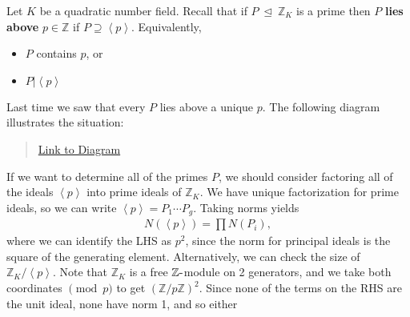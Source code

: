Let \(K\) be a quadratic number field. Recall that if
\(P {~\trianglelefteq~}{\mathbb{Z}}_K\) is a prime then \(P\)
\textbf{lies above} \(p\in {\mathbb{Z}}\) if
\(P \supseteq \left\langle{ p }\right\rangle\). Equivalently,

\begin{itemize}
\tightlist
\item
  \(P\) contains \(p\), or
\item
  \(P \mathrel{\Big|}\left\langle{ p }\right\rangle\)
\end{itemize}

Last time we saw that every \(P\) lies above a unique \(p\). The
following diagram illustrates the situation:

\begin{center}
\end{center}

\begin{quote}
\href{https://q.uiver.app/?q=WzAsNixbMCwwLCJLIl0sWzAsMiwiXFxRUSJdLFsyLDAsIlxcWlpfSyJdLFsyLDIsIlxcWloiXSxbNCwwLCJQIl0sWzQsMiwicCJdLFswLDEsIiIsMCx7InN0eWxlIjp7ImhlYWQiOnsibmFtZSI6Im5vbmUifX19XSxbMiwzLCIiLDAseyJzdHlsZSI6eyJoZWFkIjp7Im5hbWUiOiJub25lIn19fV0sWzQsNSwiIiwwLHsic3R5bGUiOnsiaGVhZCI6eyJuYW1lIjoibm9uZSJ9fX1dXQ==}{Link
to Diagram}
\end{quote}

If we want to determine all of the primes \(P\), we should consider
factoring all of the ideals \(\left\langle{ p }\right\rangle\) into
prime ideals of \({\mathbb{Z}}_K\). We have unique factorization for
prime ideals, so we can write
\(\left\langle{ p }\right\rangle = P_1 \cdots P_g\). Taking norms yields
\begin{align*}
N( \left\langle{ p }\right\rangle ) = \prod N(P_i) 
,\end{align*}
where we can identify the LHS as \(p^2\), since the norm for principal
ideals is the square of the generating element. Alternatively, we can
check the size of \({\mathbb{Z}}_K/ \left\langle{ p }\right\rangle\).
Note that \({\mathbb{Z}}_K\) is a free \({\mathbb{Z}}{\hbox{-}}\)module
on 2 generators, and we take both coordinates \(\pmod p\) to get
\(({\mathbb{Z}}/p{\mathbb{Z}})^2\). Since none of the terms on the RHS
are the unit ideal, none have norm 1, and so either

